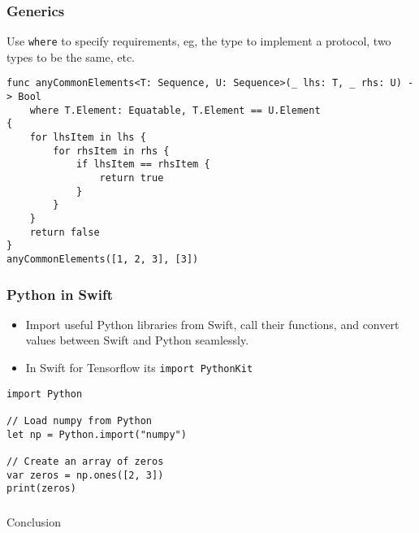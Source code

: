 \begin{frame}[fragile] \frametitle{Generics}

Use \lstinline|where| to specify requirements, eg, the type to implement a protocol, two types to be the same, etc.

\begin{lstlisting}
func anyCommonElements<T: Sequence, U: Sequence>(_ lhs: T, _ rhs: U) -> Bool
    where T.Element: Equatable, T.Element == U.Element
{
    for lhsItem in lhs {
        for rhsItem in rhs {
            if lhsItem == rhsItem {
                return true
            }
        }
    }
    return false
}
anyCommonElements([1, 2, 3], [3])
\end{lstlisting}
\end{frame}


\begin{frame}[fragile] \frametitle{Python in Swift}

\begin{itemize}
\item Import useful Python libraries from Swift, call their functions, and convert values between Swift and Python seamlessly.
\item In Swift for Tensorflow its \lstinline|import PythonKit|
\end{itemize}

\begin{lstlisting}
import Python

// Load numpy from Python
let np = Python.import("numpy")

// Create an array of zeros
var zeros = np.ones([2, 3])
print(zeros)
\end{lstlisting}
\end{frame}

\begin{frame}[fragile]\frametitle{}
\begin{center}
{\Large Conclusion}
\end{center}
\end{frame}

